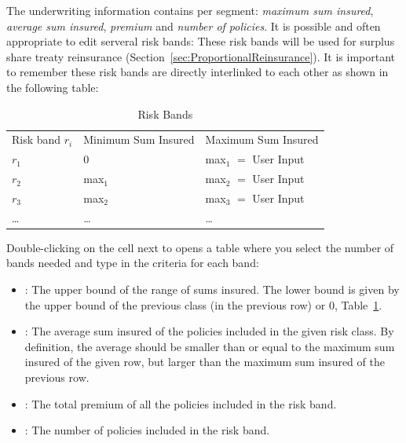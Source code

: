 The underwriting information contains per segment: \textit{maximum sum insured}, \textit{average sum insured}, \textit{premium} and \textit{number of policies}. It is possible and often appropriate to edit serveral risk bands: These risk bands will be used for surplus share treaty reinsurance (\cf Section~\ref{sec:ProportionalReinsurance}). It is important to remember these risk bands are directly interlinked to each other as shown in the following table:


\begin{table}[h]
\centering
\begin{tabular}{|l|l|l|}
\hline
Risk band $r_i$ & Minimum Sum Insured & Maximum Sum Insured \\
$r_1$ & $0$ & max$_1$ $=$ User Input \\
$r_2$ & max$_1$ & max$_2$ $=$ User Input \\
$r_3$ & max$_2$ & max$_3$ $=$ User Input \\
\ldots & \ldots & \ldots \\ 
\hline
\end{tabular}
	\caption{Risk Bands}
	\label{tab:RiskBands}
\end{table}



Double-clicking on the cell next to  opens a table where you select the number of bands needed and type in the criteria for each band:

\begin{itemize}
	\item {}: The upper bound of the range of sums insured. The lower bound is given by the upper bound of the previous
class (in the previous row) or 0, \cf Table~\ref{tab:RiskBands}.
	\item {}: The average sum insured of the policies included in the given risk class. By definition, the average should be
smaller than or equal to the maximum sum insured of the given row, but larger than the maximum sum insured of the previous row.
\item {}: The total premium of all the policies included in the risk band.
\item {}: The number of policies included in the risk band.

\end{itemize}

